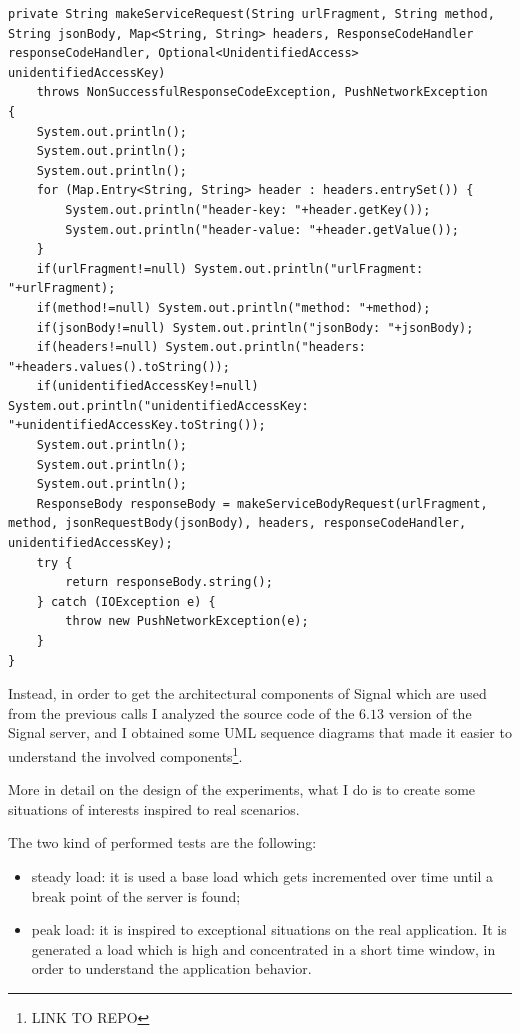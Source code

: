 \begin{verbatim}
private String makeServiceRequest(String urlFragment, String method, String jsonBody, Map<String, String> headers, ResponseCodeHandler responseCodeHandler, Optional<UnidentifiedAccess> unidentifiedAccessKey)
    throws NonSuccessfulResponseCodeException, PushNetworkException
{
    System.out.println();
    System.out.println();
    System.out.println();
    for (Map.Entry<String, String> header : headers.entrySet()) {
        System.out.println("header-key: "+header.getKey());
        System.out.println("header-value: "+header.getValue());
    }
    if(urlFragment!=null) System.out.println("urlFragment: "+urlFragment);
    if(method!=null) System.out.println("method: "+method);
    if(jsonBody!=null) System.out.println("jsonBody: "+jsonBody);
    if(headers!=null) System.out.println("headers: "+headers.values().toString());
    if(unidentifiedAccessKey!=null) System.out.println("unidentifiedAccessKey: "+unidentifiedAccessKey.toString());
    System.out.println();
    System.out.println();
    System.out.println();
    ResponseBody responseBody = makeServiceBodyRequest(urlFragment, method, jsonRequestBody(jsonBody), headers, responseCodeHandler, unidentifiedAccessKey);
    try {
        return responseBody.string();
    } catch (IOException e) {
        throw new PushNetworkException(e);
    }
}
\end{verbatim}

Instead, in order to get the architectural components of Signal which are used from the previous calls I analyzed the source code of the $6.13$ version of the Signal server, and I obtained some UML sequence diagrams that made it easier to understand the involved components\footnote{LINK TO REPO}.

More in detail on the design of the experiments, what I do is to create some situations of interests inspired to real scenarios.

The two kind of performed tests are the following:
\begin{itemize}
    \item steady load: it is used a base load which gets incremented over time until a break point of the server is found;
    \item peak load: it is inspired to exceptional situations on the real application. It is generated a load which is high and concentrated in a short time window, in order to understand the application behavior.
\end{itemize}

